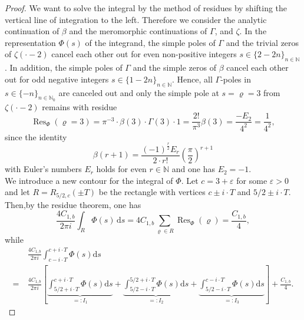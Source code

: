 \documentclass[12pt]{amsart}
\theoremstyle{definition}
\theoremstyle{remark}
\numberwithin{equation}{section}
\newcommand{\1}{\mathbbm{1}}
\begin{document}
{\begin{proof}
We want to solve the integral by the method of residues by shifting the vertical line of integration to the left. Therefore we consider the analytic continuation of $\beta$ and the meromorphic continuations of $\Gamma$, and $\zeta$. In the representation $\Phi(s)$ of the integrand, the simple poles of $\Gamma$ and the trivial zeros of $\zeta(\cdot  - 2)$ cancel each other out for even non-positive integers $s\in \{2-2n\}_{n\in \mathbb{N}}$. In addition, the simple poles of $\Gamma$ and the simple zeros of $\beta$ cancel each other out for odd negative integers $s \in \{1-2n\}_{n \in \mathbb{N}}$. Hence, all $\Gamma$-poles in $s\in\{-n\}_{n\in \mathbb{N}_0}$ are canceled out and only the simple pole at $s = \varrho = 3$ from $\zeta(\cdot - 2)$ remains with residue
$$
\operatorname{Res}_{\Phi}(\varrho = 3) = \pi^{-3} \cdot \beta(3) \cdot \Gamma(3) \cdot 1 = \frac{2!}{\pi^{3}} \beta(3) = \frac{- E_2}{4^2} = \frac{1}{4^2},
$$
since the identity
$$
\beta(r+1)=\frac{(-1)^{\frac{r}{2}} E_{r}}{2\cdot r!}\left(\frac\pi2\right)^{r+1}
$$
with Euler's numbers $E_r$ holds for even $r \in \mathbb{N}$ and one has $E_2 = -1$.\\

We introduce a new contour for the integral of $\Phi$. Let $c=3+\varepsilon$ for some $\varepsilon>0$ and let $R= R_{5/2,c}(\pm T)$ be the rectangle with vertices $c \pm i\cdot T$ and $5/2 \pm i \cdot T$. Then,by the residue theorem, one has
$$
\frac{4 C_{1,b}}{2\pi i}\int_{R} \Phi(s) \, \mathrm{d}s = 4 C_{1,b} \sum_{\varrho \in R} \operatorname{Res}_\Phi(\varrho) = \frac{C_{1,b}}{4},
$$
while
\begin{align*}
&\ \frac{4 C_{1,b}}{2\pi i}\int_{c-i\cdot T}^{c+i\cdot T} \Phi(s) \mathrm{d}s\\
=&\ \frac{4 C_{1,b}}{2\pi i} \left[\underbrace{\int_{5/2 + i\cdot T}^{c + i\cdot T} \Phi(s) \mathrm{d}s}_{=: I_1} + \underbrace{\int_{5/2-i\cdot T}^{5/2+i\cdot T} \Phi(s) \mathrm{d}s}_{=: I_2} + \underbrace{\int_{5/2 - i \cdot T}^{c- i \cdot T} \Phi(s) \mathrm{d}s}_{=: I_3}\right] + \frac{C_{1,b}}{4}.
\end{align*}


\end{proof}}
\end{document}
